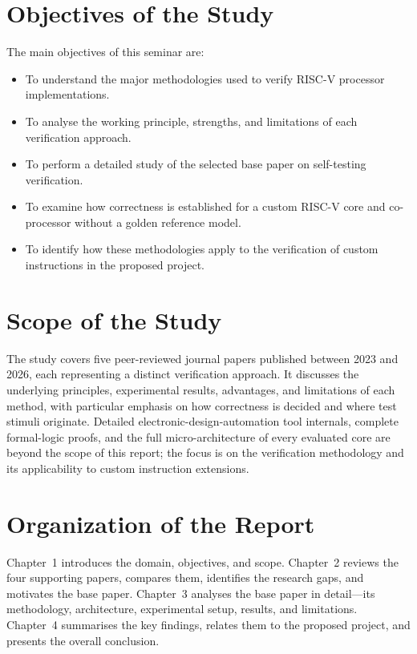 \documentclass[12pt,a4paper]{report}
\begin{document}
\section{Objectives of the Study}
The main objectives of this seminar are:
\begin{itemize}[nosep]
  \item To understand the major methodologies used to verify RISC-V processor
        implementations.
  \item To analyse the working principle, strengths, and limitations of each
        verification approach.
  \item To perform a detailed study of the selected base paper on self-testing
        verification.
  \item To examine how correctness is established for a custom RISC-V core and
        co-processor without a golden reference model.
  \item To identify how these methodologies apply to the verification of custom
        instructions in the proposed project.
\end{itemize}

\section{Scope of the Study}
The study covers five peer-reviewed journal papers published between 2023 and 2026, each
representing a distinct verification approach. It discusses the underlying principles,
experimental results, advantages, and limitations of each method, with particular emphasis
on how correctness is decided and where test stimuli originate. Detailed
electronic-design-automation tool internals, complete formal-logic proofs, and the full
micro-architecture of every evaluated core are beyond the scope of this report; the focus
is on the verification methodology and its applicability to custom instruction extensions.

\section{Organization of the Report}
Chapter~1 introduces the domain, objectives, and scope. Chapter~2 reviews the four
supporting papers, compares them, identifies the research gaps, and motivates the base
paper. Chapter~3 analyses the base paper in detail---its methodology, architecture,
experimental setup, results, and limitations. Chapter~4 summarises the key findings,
relates them to the proposed project, and presents the overall conclusion.
\end{document}
